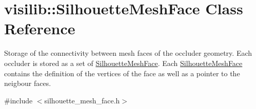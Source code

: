 \hypertarget{classvisilib_1_1_silhouette_mesh_face}{}\section{visilib\+::Silhouette\+Mesh\+Face Class Reference}
\label{classvisilib_1_1_silhouette_mesh_face}


Storage of the connectivity between mesh faces of the occluder geometry. Each occluder is stored as a set of \mbox{\hyperlink{classvisilib_1_1_silhouette_mesh_face}{Silhouette\+Mesh\+Face}}. Each \mbox{\hyperlink{classvisilib_1_1_silhouette_mesh_face}{Silhouette\+Mesh\+Face}} contains the definition of the vertices of the face as well as a pointer to the neigbour faces.  




{\ttfamily \#include $<$silhouette\+\_\+mesh\+\_\+face.\+h$>$}

